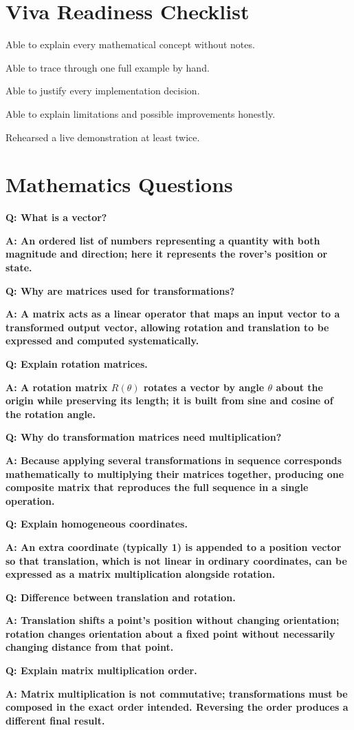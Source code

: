 \documentclass[12pt]{report}
\newcommand{\headingfont}{\sffamily}
\newcommand{\qanda}[2]{
  \par\vspace{4pt}\noindent\headingfont\bfseries\color{HUPurple}Q: \normalfont\color{HUDark}#1\par
  \noindent\headingfont\bfseries\color{HUGold}A: \normalfont\color{black}#2\par\vspace{2pt}
}
\begin{document}
\section{Viva Readiness Checklist}
\begin{checklist}
\item Able to explain every mathematical concept without notes.
\item Able to trace through one full example by hand.
\item Able to justify every implementation decision.
\item Able to explain limitations and possible improvements honestly.
\item Rehearsed a live demonstration at least twice.
\end{checklist}

\section{Mathematics Questions}
\qanda{What is a vector?}{An ordered list of numbers representing a quantity with both magnitude and direction; here it represents the rover's position or state.}
\qanda{Why are matrices used for transformations?}{A matrix acts as a linear operator that maps an input vector to a transformed output vector, allowing rotation and translation to be expressed and computed systematically.}
\qanda{Explain rotation matrices.}{A rotation matrix $R(\theta)$ rotates a vector by angle $\theta$ about the origin while preserving its length; it is built from sine and cosine of the rotation angle.}
\qanda{Why do transformation matrices need multiplication?}{Because applying several transformations in sequence corresponds mathematically to multiplying their matrices together, producing one composite matrix that reproduces the full sequence in a single operation.}
\qanda{Explain homogeneous coordinates.}{An extra coordinate (typically 1) is appended to a position vector so that translation, which is not linear in ordinary coordinates, can be expressed as a matrix multiplication alongside rotation.}
\qanda{Difference between translation and rotation.}{Translation shifts a point's position without changing orientation; rotation changes orientation about a fixed point without necessarily changing distance from that point.}
\qanda{Explain matrix multiplication order.}{Matrix multiplication is not commutative; transformations must be composed in the exact order intended. Reversing the order produces a different final result.}
\end{document}
